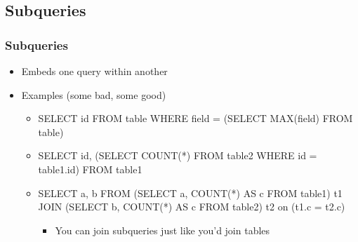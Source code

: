 \documentclass{beamer}
\begin{document}
\subsection{Subqueries}
\begin{frame}
    \frametitle{Subqueries}
    \begin{itemize}
        \item Embeds one query within another
        \pause
        \item Examples (some bad, some good)
        \pause
        \begin{itemize}
            \item SELECT id FROM table WHERE field = (SELECT MAX(field) FROM table)
            \pause
            \item SELECT id, (SELECT COUNT(*) FROM table2 WHERE id = table1.id) FROM table1
            \pause
            \item SELECT a, b FROM (SELECT a, COUNT(*) AS c FROM table1) t1 JOIN (SELECT b, COUNT(*) AS c FROM table2) t2 on (t1.c = t2.c)
            \pause
            \begin{itemize}
                \item You can join subqueries just like you'd join tables
            \end{itemize}
        \end{itemize}
    \end{itemize}
\end{frame}
\end{document}
